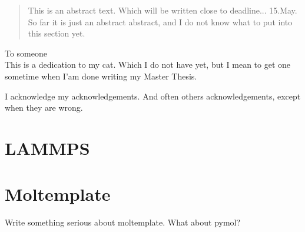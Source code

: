 \documentclass[twoside,english]{uiofysmaster}
\begin{document}

\cleardoublepage
\begin{abstract}
This is an abstract text. Which will be written close to deadline... 15.May. So far it is just an abstract abstract, and I do not know what to put into this section yet.
\end{abstract}

\begin{dedication}                                                    %
  To someone
  \\\vspace{12pt}
  This is a dedication to my cat. Which I do not have yet, but I mean to get one sometime when I'am done writing my Master Thesis.
\end{dedication}

\begin{acknowledgements}                                              %
  I acknowledge my acknowledgements. And often others acknowledgements, except when they are wrong.
\end{acknowledgements}

\tableofcontents

\chapter{LAMMPS}                                                      %


\chapter{Moltemplate}                                                 %
Write something serious about moltemplate. What about pymol?

\end{document}
